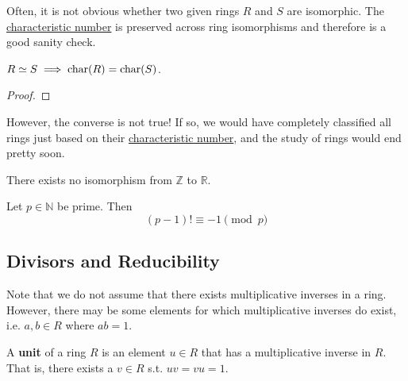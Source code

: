   Often, it is not obvious whether two given rings $R$ and $S$ are isomorphic. The \hyperref[def:characteristic-number]{characteristic number} is preserved across ring isomorphisms and therefore is a good sanity check. 

  \begin{theorem}
    \label{thm:preservation-of-characteristic-number-in-a-ring}
    $R \simeq S \implies \operatorname{char}(R) = \operatorname{char}(S)$. 
  \end{theorem}
  \begin{proof}

  \end{proof}

  However, the converse is not true! If so, we would have completely classified all rings just based on their \hyperref[def:characteristic-number]{characteristic number}, and the study of rings would end pretty soon. 

  \begin{example}
    \label{ex:same-characteristic-does-not-imply-isomorphic}
    There exists no isomorphism from $\mathbb{Z}$ to $\mathbb{R}$. 
  \end{example}

  \begin{theorem}
    \label{thm:wilsons-theorem}
    Let $p \in \mathbb{N}$ be prime. Then 
    \begin{equation}
      (p-1)! \equiv -1 \pmod{p}
    \end{equation}
  \end{theorem}
  
\subsection{Divisors and Reducibility} 

  Note that we do not assume that there exists multiplicative inverses in a ring. However, there may be some elements for which multiplicative inverses do exist, i.e. $a, b \in R$ where $ab = 1$. 

  \begin{definition}[Unit]
    \label{def:unit}
    A \textbf{unit} of a ring $R$ is an element $u \in R$ that has a multiplicative inverse in $R$. That is, there exists a $v \in R$ s.t. $uv = vu = 1$. 
  \end{definition}

